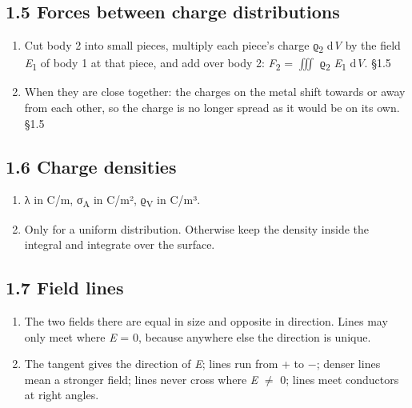 \documentclass[11pt]{article}
\begin{document}
\begin{keepsection}\subsection{1.5 Forces between charge distributions}

\begin{enumerate}
\item Cut body 2 into small pieces, multiply each piece’s charge ϱ\textsubscript{2} d\textit{V} by the field \textit{E}\textsubscript{1} of body 1 at that piece, and add over body 2: \textit{F}\textsubscript{2} = $\iiint $ ϱ\textsubscript{2} \textit{E}\textsubscript{1} d\textit{V}. \hfill{\small\color{FAUblue}§1.5}
\item When they are close together: the charges on the metal shift towards or away from each other, so the charge is no longer spread as it would be on its own. \hfill{\small\color{FAUblue}§1.5}
\end{enumerate}

\end{keepsection}
\begin{keepsection}\subsection{1.6 Charge densities}

\begin{enumerate}
\item λ in C/m, σ\textsubscript{A} in C/m², ϱ\textsubscript{V} in C/m³.
\item Only for a uniform distribution. Otherwise keep the density inside the integral and integrate over the surface.
\end{enumerate}

\end{keepsection}
\begin{keepsection}\subsection{1.7 Field lines}

\begin{enumerate}
\item The two fields there are equal in size and opposite in direction. Lines may only meet where \textit{E} = 0, because anywhere else the direction is unique.
\item The tangent gives the direction of \textit{E}; lines run from + to \ensuremath{-}; denser lines mean a stronger field; lines never cross where \textit{E} \ensuremath{\neq} 0; lines meet conductors at right angles.
\end{enumerate}

\end{keepsection}
\end{document}
